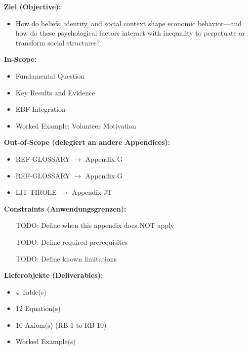 \begin{tcolorbox}[
    colback=orange!5!white,
    colframe=orange!75!black,
    title={\textbf{Appendix Scope: Ziel / In-Scope / Out-of-Scope / Constraints}},
    fonttitle=\bfseries
]

\textbf{Ziel (Objective):}
\begin{itemize}[nosep]
    \item How do beliefs, identity, and social context shape economic behavior---and how do these psychological factors interact with inequality to perpetuate or transform social structures?
\end{itemize}

\textbf{In-Scope:}
\begin{itemize}[nosep]
    \item Fundamental Question
    \item Key Results and Evidence
    \item EBF Integration
    \item Worked Example: Volunteer Motivation
\end{itemize}

\textbf{Out-of-Scope (delegiert an andere Appendices):}
\begin{itemize}[nosep]
    \item REF-GLOSSARY $\rightarrow$ Appendix G
    \item REF-GLOSSARY $\rightarrow$ Appendix G
    \item LIT-TIROLE $\rightarrow$ Appendix JT
\end{itemize}

\textbf{Constraints (Anwendungsgrenzen):}
\begin{itemize}[nosep]
    \item [TODO: Define when this appendix does NOT apply]
    \item [TODO: Define required prerequisites]
    \item [TODO: Define known limitations]
\end{itemize}

\textbf{Lieferobjekte (Deliverables):}
\begin{itemize}[nosep]
    \item 4 Table(s)
    \item 12 Equation(s)
    \item 10 Axiom(s) (RB-1 to RB-10)
    \item Worked Example(s)
\end{itemize}

\end{tcolorbox}


